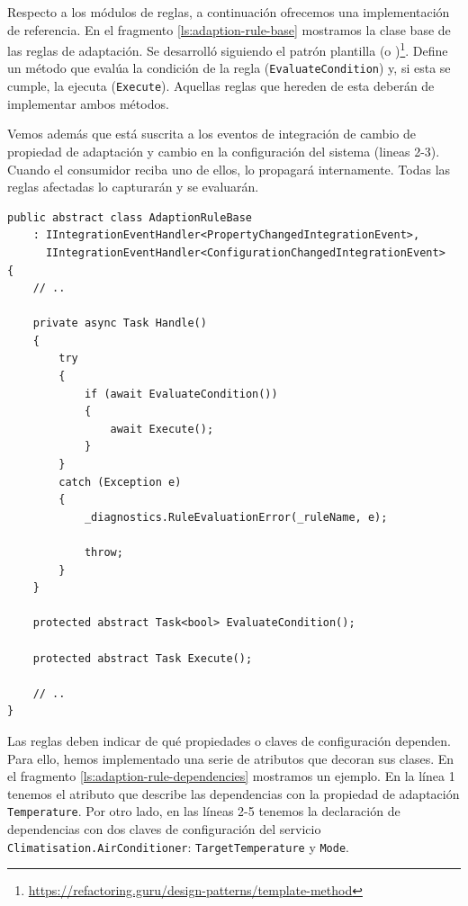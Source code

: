 Respecto a los módulos de reglas, a continuación ofrecemos una implementación de referencia. En el fragmento \ref{ls:adaption-rule-base} mostramos la clase base de las reglas de adaptación. Se desarrolló siguiendo el patrón plantilla (o )\footnote{\url{https://refactoring.guru/design-patterns/template-method}}. Define un método que evalúa la condición de la regla (\texttt{EvaluateCondition}) y, si esta se cumple, la ejecuta (\texttt{Execute}). Aquellas reglas que hereden de esta deberán de implementar ambos métodos.

Vemos además que está suscrita a los eventos de integración de cambio de propiedad de adaptación y cambio en la configuración del sistema (lineas 2-3). Cuando el consumidor reciba uno de ellos, lo propagará internamente. Todas las reglas afectadas lo capturarán y se evaluarán.

\begin{lstlisting}[language={[Sharp]C},caption={Clase base para implementar reglas de adaptación. Se evalúa la condición, y si esta se cumple, se ejecuta.},captionpos=b, label=ls:adaption-rule-base]
public abstract class AdaptionRuleBase
    : IIntegrationEventHandler<PropertyChangedIntegrationEvent>,
      IIntegrationEventHandler<ConfigurationChangedIntegrationEvent>
{
    // ..

    private async Task Handle()
    {
        try
        {
            if (await EvaluateCondition())
            {
                await Execute();
            }
        }
        catch (Exception e)
        {
            _diagnostics.RuleEvaluationError(_ruleName, e);

            throw;
        }
    }

    protected abstract Task<bool> EvaluateCondition();

    protected abstract Task Execute();

    // ..
}
\end{lstlisting}

Las reglas deben indicar de qué propiedades o claves de configuración dependen. Para ello, hemos implementado una serie de atributos que decoran sus clases. En el fragmento \ref{ls:adaption-rule-dependencies} mostramos un ejemplo. En la línea 1 tenemos el atributo que describe las dependencias con la propiedad de adaptación \texttt{Temperature}. Por otro lado, en las líneas 2-5 tenemos la declaración de dependencias con dos claves de configuración del servicio \texttt{Climatisation.AirConditioner}: \texttt{TargetTemperature} y \texttt{Mode}.

